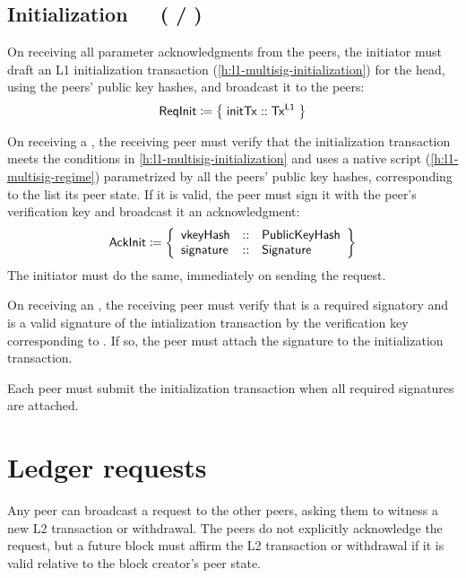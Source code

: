 \documentclass[../hydrozoa.tex]{subfiles}
\begin{document}
\subsection{Initialization~~~( / )}%
\label{h:l2-consensus-intitialization}%

On receiving all parameter acknowledgments from the peers, the initiator must draft an L1 initialization transaction (\cref{h:l1-multisig-initialization}) for the head, using the peers' public key hashes, and broadcast it to the peers:
\begin{equation*}
  \mathsf{ReqInit} \coloneq \;\bigr\{\; \mathsf{initTx} :: \mathsf{Tx^{L1}} \;\bigr\}
\end{equation*}

On receiving a , the receiving peer must verify that the initialization transaction meets the conditions in \cref{h:l1-multisig-initialization} and uses a native script (\cref{h:l1-multisig-regime}) parametrized by all the peers' public key hashes, corresponding to the  list its peer state.
If it is valid, the peer must sign it with the peer's verification key and broadcast it an acknowledgment:
\begin{equation*}
  \mathsf{AckInit} \coloneq \left\{
  \begin{array}{lll}
    \mathsf{vkeyHash} &::& \mathsf{PublicKeyHash} \\
    \mathsf{signature} &::& \mathsf{Signature}
  \end{array}\right\}
\end{equation*}
The initiator must do the same, immediately on sending the  request.

On receiving an , the receiving peer must verify that  is a required signatory and  is a valid signature of the intialization transaction by the verification key corresponding to .
If so, the peer must attach the signature to the initialization transaction.

Each peer must submit the initialization transaction when all required signatures are attached.

\section{Ledger requests}%
\label{h:l2-consensus-ledger}%

Any peer can broadcast a request to the other peers, asking them to witness a new L2 transaction or withdrawal.
The peers do not explicitly acknowledge the request, but a future block must affirm the L2 transaction or withdrawal if it is valid relative to the block creator's peer state.
\end{document}
